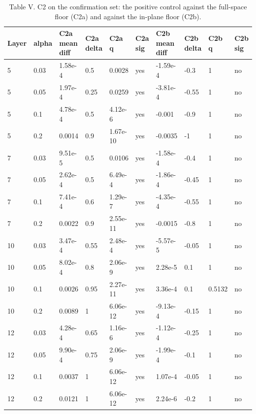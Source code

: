 \begin{table}[t]
\centering
\caption{Table V. C2 on the confirmation set: the positive control against the full-space floor (C2a) and against the in-plane floor (C2b).}
\label{tab:v}
\begin{tabular}{llllllllll}
\toprule
Layer & alpha & C2a mean diff & C2a delta & C2a q & C2a sig & C2b mean diff & C2b delta & C2b q & C2b sig \\
\midrule
5 & 0.03 & 1.58e-4 & 0.5 & 0.0028 & yes & -1.59e-4 & -0.3 & 1 & no \\
5 & 0.05 & 1.97e-4 & 0.25 & 0.0259 & yes & -3.81e-4 & -0.55 & 1 & no \\
5 & 0.1 & 4.78e-4 & 0.5 & 4.12e-6 & yes & -0.001 & -0.9 & 1 & no \\
5 & 0.2 & 0.0014 & 0.9 & 1.67e-10 & yes & -0.0035 & -1 & 1 & no \\
7 & 0.03 & 9.51e-5 & 0.5 & 0.0106 & yes & -1.58e-4 & -0.4 & 1 & no \\
7 & 0.05 & 2.62e-4 & 0.5 & 6.49e-4 & yes & -1.86e-4 & -0.45 & 1 & no \\
7 & 0.1 & 7.41e-4 & 0.6 & 1.29e-7 & yes & -4.35e-4 & -0.55 & 1 & no \\
7 & 0.2 & 0.0022 & 0.9 & 2.55e-11 & yes & -0.0015 & -0.8 & 1 & no \\
10 & 0.03 & 3.47e-4 & 0.55 & 2.48e-4 & yes & -5.57e-5 & -0.05 & 1 & no \\
10 & 0.05 & 8.02e-4 & 0.8 & 2.06e-9 & yes & 2.28e-5 & 0.1 & 1 & no \\
10 & 0.1 & 0.0026 & 0.95 & 2.27e-11 & yes & 3.36e-4 & 0.1 & 0.5132 & no \\
10 & 0.2 & 0.0089 & 1 & 6.06e-12 & yes & -9.13e-4 & -0.15 & 1 & no \\
12 & 0.03 & 4.28e-4 & 0.65 & 1.16e-6 & yes & -1.12e-4 & -0.25 & 1 & no \\
12 & 0.05 & 9.90e-4 & 0.75 & 2.06e-9 & yes & -1.99e-4 & -0.1 & 1 & no \\
12 & 0.1 & 0.0037 & 1 & 6.06e-12 & yes & 1.07e-4 & -0.05 & 1 & no \\
12 & 0.2 & 0.0121 & 1 & 6.06e-12 & yes & 2.24e-6 & -0.2 & 1 & no \\
\bottomrule
\end{tabular}
\end{table}